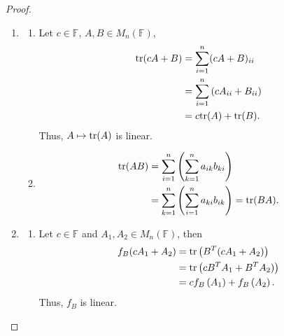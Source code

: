 \documentclass[11pt]{book}
\theoremstyle{definition}
\numberwithin{equation}{chapter}
\begin{document}
\begin{proof}
~\begin{enumerate}[label=(\alph*)]
    \item \begin{enumerate}[label=\arabic*)]
        \item Let $c \in \mathbb{F}$, $A, B \in M_n(\mathbb{F})$, 
        \begin{align*}
            {\rm tr}(cA + B) & = \sum^n_{i=1} (cA + B)_{ii} \\
            & = \sum^n_{i=1} \left(cA_{ii} + B_{ii}\right) \\
            & = c {\rm tr}(A) + {\rm tr}(B).
        \end{align*}
        Thus, $A \mapsto {\rm tr}(A)$ is linear.
        
        \item 
        \begin{align*}
            {\rm tr}(AB) & = \sum^n_{i=1}\left(\sum^n_{k=1} a_{ik} b_{ki}\right) \\
            & = \sum^n_{k=1}\left(\sum^n_{i=1} a_{ki} b_{ik}\right) = {\rm tr}(BA).
        \end{align*}
    \end{enumerate}
    
    \item \begin{enumerate}[label=\arabic*)]
        \item Let $c \in \mathbb{F}$ and $A_1, A_2 \in  M_n(\mathbb{F})$, then
        \begin{align*}
            f_B(cA_1 + A_2) & = {\rm tr}\left(B^T (cA_1 + A_2)\right) \\
            & = {\rm tr}\left(c B^T A_1 + B^T A_2)\right) \\
            & = c f_B\left(A_1\right) + f_B\left(A_2\right).
        \end{align*}
        Thus, $f_B$ is linear.
        

\end{enumerate}
\end{enumerate}
\end{proof}
\end{document}
